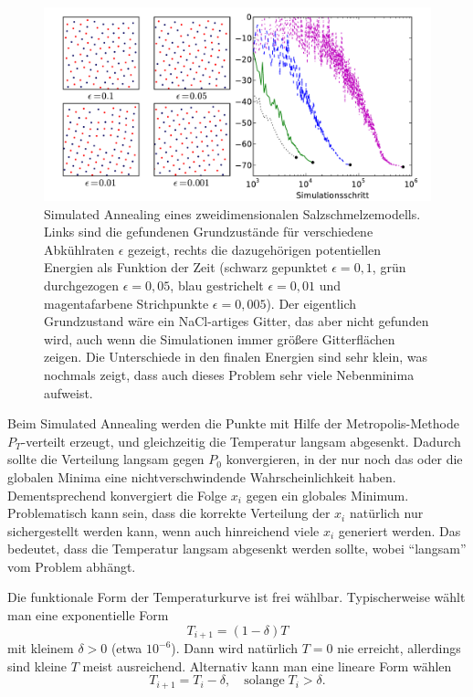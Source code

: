 \begin{figure}
  \centering
  \includegraphics[width=\textwidth]{plots/simulated_annealing}
  \caption{Simulated Annealing eines zweidimensionalen
    Salzschmelzemodells. Links sind die gefundenen Grundzustände für
    verschiedene Abkühlraten $\epsilon$ gezeigt, rechts die
    dazugehörigen potentiellen Energien als Funktion der Zeit (schwarz
    gepunktet $\epsilon=0,1$, grün durchgezogen $\epsilon=0,05$, blau
    gestrichelt $\epsilon=0,01$ und magentafarbene Strichpunkte
    $\epsilon=0,005$). Der eigentlich Grundzustand wäre ein
    NaCl-artiges Gitter, das aber nicht gefunden wird, auch wenn die
    Simulationen immer größere Gitterflächen zeigen. Die Unterschiede
    in den finalen Energien sind sehr klein, was nochmals zeigt,
    dass auch dieses Problem sehr viele Nebenminima aufweist.}
  \label{fig:simanneal}
\end{figure}

Beim Simulated Annealing werden die Punkte mit Hilfe der
Metropolis-Methode $P_T$-verteilt erzeugt, und gleichzeitig die
Temperatur langsam abgesenkt. Dadurch sollte die Verteilung langsam
gegen $P_0$ konvergieren, in der nur noch das oder die globalen Minima
eine nichtverschwindende Wahrscheinlichkeit haben. Dementsprechend
konvergiert die Folge $x_i$ gegen ein globales Minimum. Problematisch
kann sein, dass die korrekte Verteilung der $x_i$ natürlich nur
sichergestellt werden kann, wenn auch hinreichend viele $x_i$
generiert werden. Das bedeutet, dass die Temperatur langsam abgesenkt
werden sollte, wobei ``langsam'' vom Problem abhängt.

Die funktionale Form der Temperaturkurve ist frei
wählbar. Typischerweise wählt man eine exponentielle Form
\begin{equation}
  T_{i+1} = (1-\delta)T
\end{equation}
mit kleinem $\delta > 0$ (etwa $10^{-6}$). Dann wird natürlich $T=0$
nie erreicht, allerdings sind kleine $T$ meist ausreichend. Alternativ
kann man eine lineare Form wählen
\begin{equation}
  T_{i+1} = T_i - \delta,\quad\text{solange}\; T_i>\delta.
\end{equation}

